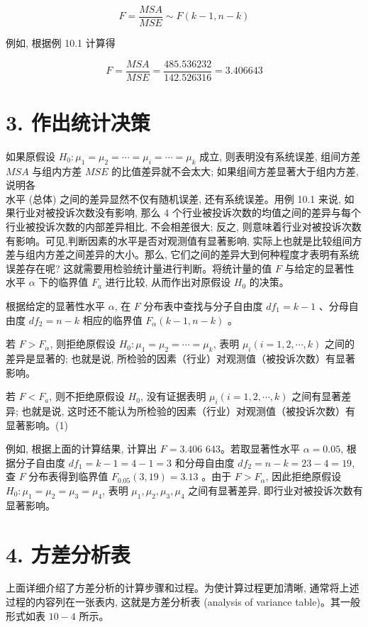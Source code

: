 \documentclass[10pt]{article}
\begin{document}
\begin{CJK*}{UTF8}{bsmi}
\begin{equation*}
F=\frac{M S A}{M S E} \sim F(k-1, n-k) \tag{10.9}
\end{equation*}


例如, 根据例 10.1 计算得

$$
F=\frac{M S A}{M S E}=\frac{485.536232}{142.526316}=3.406643
$$

\section*{3. 作出统计决策}
如果原假设 $H_{0}: \mu_{1}=\mu_{2}=\cdots=\mu_{i}=\cdots=\mu_{k}$ 成立, 则表明没有系统误差, 组间方差 $M S A$ 与组内方差 $M S E$ 的比值差异就不会太大; 如果组间方差显著大于组内方差, 说明各\\
水平 (总体) 之间的差异显然不仅有随机误差, 还有系统误差。用例 10.1 来说, 如果行业对被投诉次数没有影响, 那么 4 个行业被投诉次数的均值之间的差异与每个行业被投诉次数的内部差异相比, 不会相差很大; 反之, 则意味着行业对被投诉次数有影响。可见,判断因素的水平是否对观测值有显著影响, 实际上也就是比较组间方差与组内方差之间差异的大小。那么, 它们之间的差异大到何种程度才表明有系统误差存在呢? 这就需要用检验统计量进行判断。将统计量的值 $F$ 与给定的显著性水平 $\alpha$ 下的临界值 $F_{a}$ 进行比较, 从而作出对原假设 $H_{0}$ 的决策。

根据给定的显著性水平 $\alpha$, 在 $F$ 分布表中查找与分子自由度 $d f_{1}=k-1$ 、分母自由度 $d f_{2}=n-k$ 相应的临界值 $F_{\alpha}(k-1, n-k)$ 。

若 $F>F_{\alpha}$, 则拒绝原假设 $H_{0}: \mu_{1}=\mu_{2}=\cdots=\mu_{k}$, 表明 $\mu_{i}(i=1,2, \cdots, k)$ 之间的差异是显著的; 也就是说, 所检验的因素（行业）对观测值（被投诉次数）有显著影响。

若 $F<F_{a}$, 则不拒绝原假设 $H_{0}$, 没有证据表明 $\mu_{i}(i=1,2, \cdots, k)$ 之间有显著差异; 也就是说, 这时还不能认为所检验的因素（行业）对观测值（被投诉次数）有显著影响。(1)

例如, 根据上面的计算结果, 计算出 $F=3.406$ 643。若取显著性水平 $\alpha=0.05$, 根据分子自由度 $d f_{1}=k-1=4-1=3$ 和分母自由度 $d f_{2}=n-k=23-4=19$, 查 $F$ 分布表得到临界值 $F_{0.05}(3,19)=3.13$ 。由于 $F>F_{\alpha}$, 因此拒绝原假设 $H_{0}: \mu_{1}=\mu_{2}=\mu_{3}=\mu_{4}$, 表明 $\mu_{1}, \mu_{2}, \mu_{3}, \mu_{4}$ 之间有显著差异, 即行业对被投诉次数有显著影响。

\section*{4. 方差分析表}
上面详细介绍了方差分析的计算步骤和过程。为使计算过程更加清晰, 通常将上述过程的内容列在一张表内, 这就是方差分析表 (analysis of variance table)。其一般形式如表 $10-4$ 所示。


\end{CJK*}
\end{document}
